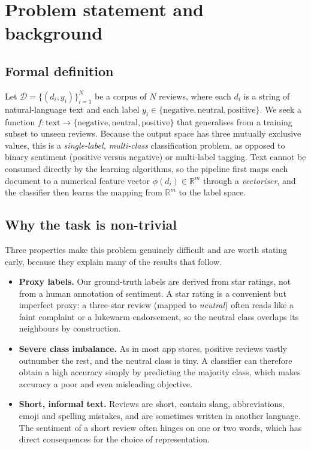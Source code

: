 \documentclass[11pt,a4paper]{article}
\begin{document}
\section{Problem statement and background}
\label{sec:problem}
\subsection{Formal definition}
Let $\mathcal{D} = \{(d_i, y_i)\}_{i=1}^{N}$ be a corpus of $N$ reviews, where each
$d_i$ is a string of natural-language text and each label
$y_i \in \{\text{negative}, \text{neutral}, \text{positive}\}$. We seek a function
$f : \text{text} \rightarrow \{\text{negative}, \text{neutral}, \text{positive}\}$
that generalises from a training subset to unseen reviews. Because the output space has
three mutually exclusive values, this is a \emph{single-label, multi-class}
classification problem, as opposed to binary sentiment (positive versus negative) or
multi-label tagging. Text cannot be consumed directly by the learning algorithms, so
the pipeline first maps each document to a numerical feature vector
$\phi(d_i) \in \mathbb{R}^m$ through a \emph{vectoriser}, and the classifier then learns
the mapping from $\mathbb{R}^m$ to the label space.

\subsection{Why the task is non-trivial}
Three properties make this problem genuinely difficult and are worth stating early,
because they explain many of the results that follow.
\begin{itemize}[leftmargin=1.4em,itemsep=1pt]
\item \textbf{Proxy labels.} Our ground-truth labels are derived from star ratings, not
from a human annotation of sentiment. A star rating is a convenient but imperfect proxy:
a three-star review (mapped to \emph{neutral}) often reads like a faint complaint or a
lukewarm endorsement, so the neutral class overlaps its neighbours by construction.
\item \textbf{Severe class imbalance.} As in most app stores, positive reviews vastly
outnumber the rest, and the neutral class is tiny. A classifier can therefore obtain a
high accuracy simply by predicting the majority class, which makes accuracy a poor and
even misleading objective.
\item \textbf{Short, informal text.} Reviews are short, contain slang, abbreviations,
emoji and spelling mistakes, and are sometimes written in another language. The
sentiment of a short review often hinges on one or two words, which has direct
consequences for the choice of representation.
\end{itemize}
\end{document}
